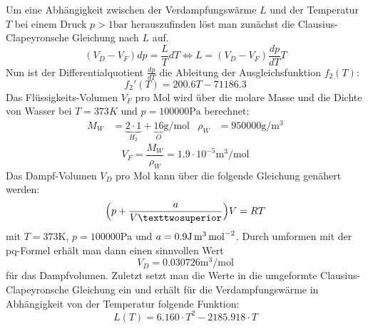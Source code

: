 Um eine Abhängigkeit zwischen der Verdampfungswärme $L$ und der Temperatur
$T$ bei einem Druck $p > 1\si{\bar}$ herauszufinden löst man zunächst die
Clausius-Clapeyronsche Gleichung nach $L$ auf.
\begin{equation}
  (V_D - V_F) dp = \frac{L}{T} dT
  \iff L = (V_D - V_F) \frac{dp}{dT} T
\end{equation}
Nun ist der Differentialquotient $\frac{dp}{dT}$ die Ableitung der
Ausgleichsfunktion $f_2(T)$:
\begin{equation}
  f_2'(T) = 200.6 T - 71186.3
\end{equation}
Das Flüssigkeits-Volumen $V_F$ pro Mol wird über die molare Masse und die
Dichte von Wasser\cite{stoffwerte} bei $T = 373 K$ und
$p = 100000 \si{\Pa}$ berechnet:
\begin{align}
  M_W & = \underbrace{2 \cdot 1}_{H_2} + \underbrace{16}_{O}
  \si{\gram\per\mol} & \rho_W & = 950000 \si{\gram\per\cubic\meter}
\end{align}
\begin{equation}
  V_F = \frac{M_W}{\rho_W} = 1.9 \cdot 10^{-5} \si{\cubic\meter\per\mol}
\end{equation}
Das Dampf-Volumen $V_D$ pro Mol kann über die folgende Gleichung genähert
werden:
\begin{equation}
  \Bigl(p + \frac{a}{V²}\Bigr)V = R T
\end{equation} mit $T = 373 \si{\kelvin}$, $p = 100000 \si{\Pa}$ und
$a = 0.9 \si[per-mode=reciprocal]{\joule\cubic\meter\per\mol\squared}$.
Durch umformen mit der \\
pq-Formel erhält man dann einen sinnvollen Wert
\begin{equation}
  V_D = 0.030726 \si{\cubic\meter\per\mol}
\end{equation} für das Dampfvolumen.
Zuletzt setzt man die Werte in die umgeformte
Clausius-Clapeyronsche Gleichung ein und erhält für die Verdampfungswärme in
Abhängigkeit von der Temperatur folgende Funktion:
\begin{equation}
  L(T) = 6.160 \cdot T^2 - 2185.918 \cdot T
\end{equation}

\newpage

